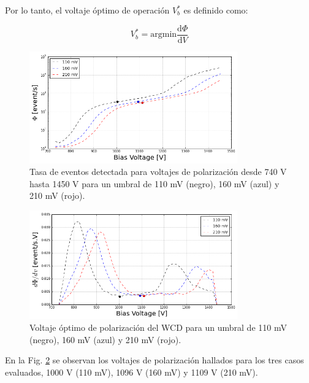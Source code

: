 Por lo tanto, el voltaje óptimo de operación $V^{\ast}_b$ es definido como:

\begin{equation}
V^{\ast}_b =  \textrm{argmin} \frac{\textrm{d}\Phi}{\textrm{d} V} 
\end{equation}

\begin{figure}[h!]
\begin{center}
\includegraphics[width=0.8\textwidth]{Figures/WCDCalibrated}
\caption{Tasa de eventos detectada para voltajes de polarización desde 740 V hasta 1450 V para un umbral de 110 mV (negro), 160 mV (azul) y 210 mV (rojo).}
\label{plateau}
\end{center}
\end{figure}

\begin{figure}[h!]
\begin{center}
\includegraphics[width=0.8\textwidth]{Figures/OptimumPoint}
\caption{Voltaje óptimo de polarización del WCD para un umbral de 110 mV (negro), 160 mV (azul) y 210 mV (rojo).}
\label{OptimumWCD}
\end{center}
\end{figure}

En la Fig. \ref{OptimumWCD} se observan los voltajes de polarización hallados para los tres casos evaluados, 1000 V (110 mV), 1096 V (160 mV) y 1109 V (210 mV). 

